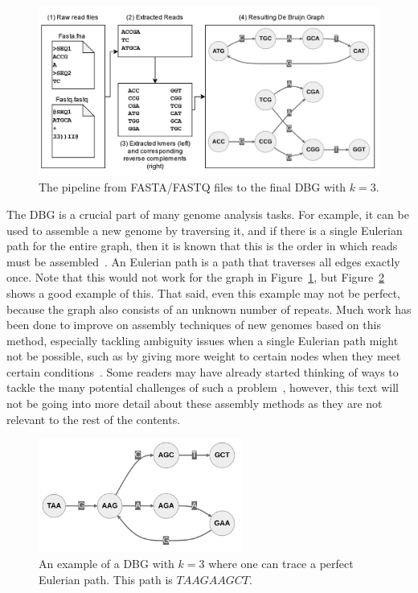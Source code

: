 \begin{figure}[t]
  \centering
  \includegraphics[width=\textwidth]{images/FastaqToDbg.png}
  \caption{The pipeline from FASTA/FASTQ files to the final DBG with $k = 3$.}\label{fig:FastaqToDbg}
\end{figure}

The DBG is a crucial part of many genome analysis tasks.
For example, it can be used to assemble a new genome by traversing it, and if there is a single Eulerian path for the entire graph, then it is known that this is the order in which reads must be assembled~\cite{DeBruijnGraph}.
An Eulerian path is a path that traverses all edges exactly once.
Note that this would not work for the graph in Figure~\ref{fig:FastaqToDbg}, but Figure~\ref{fig:EulerianPath} shows a good example of this.
That said, even this example may not be perfect, because the graph also consists of an unknown number of repeats.
Much work has been done to improve on assembly techniques of new genomes based on this method, especially tackling ambiguity issues when a single Eulerian path might not be possible, such as by giving more weight to certain nodes when they meet certain conditions~\cite{DeBruijnGraph, EulerianPath}.
Some readers may have already started thinking of ways to tackle the many potential challenges of such a problem~\cite{ModernAssembly}, however, this text will not be going into more detail about these assembly methods as they are not relevant to the rest of the contents.

\begin{figure}[t]
  \centering
  \includegraphics[width=0.6\textwidth]{images/EulerianPath.png}
  \caption{An example of a DBG with $k = 3$ where one can trace a perfect Eulerian path. This path is $TAAGAAGCT$.}\label{fig:EulerianPath}
\end{figure}


